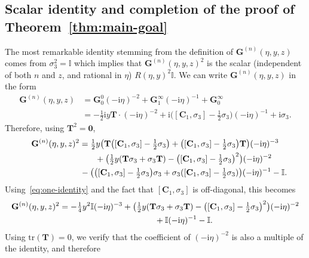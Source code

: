 \documentclass[11pt]{article}
\numberwithin{equation}{section}
\numberwithin{equation}{section}
\begin{document}
\subsection{Scalar identity and completion of the proof of Theorem~\ref{thm:main-goal}}
The most remarkable identity stemming from the definition of $\mathbf{G}^{(n)}(\eta,y,z)$ comes from $\sigma_3^2=\mathbb{I}$ which implies that $\mathbf{G}^{(n)}(\eta,y,z)^2$ is the scalar (independent of both $n$ and $z$, and rational in $\eta$) $R(\eta,y)^2\mathbb{I}$. We can write $\mathbf{G}^{(n)}(\eta,y,z)$ in the form
\begin{align*}
\mathbf{G}^{(n)}(\eta,y,z)& =\mathbf{G}_0^0(-\mathrm{i}\eta)^{-2} + \mathbf{G}_1^\infty(-\mathrm{i}\eta)^{-1} +\mathbf{G}_0^\infty \\
& = -\tfrac{1}{2}\mathrm{i} y\mathbf{T}\cdot(-\mathrm{i}\eta)^{-2} +
\mathrm{i} \bigl([\mathbf{C}_1,\sigma_3]-\tfrac{1}{2}\sigma_3\bigr)(-\mathrm{i}\eta)^{-1} +\mathrm{i}\sigma_3.
\end{align*}
Therefore, using $\mathbf{T}^2=\mathbf{0}$,
\begin{gather*}
\mathbf{G}^{(n)}(\eta,y,z)^2 = \tfrac{1}{2}y\bigl(\mathbf{T}\bigl([\mathbf{C}_1,\sigma_3]-\tfrac{1}{2}\sigma_3\bigr)+\bigl([\mathbf{C}_1,\sigma_3]-\tfrac{1}{2}\sigma_3\bigr)\mathbf{T}\bigr)(-\mathrm{i}\eta)^{-3} \\
\hphantom{\mathbf{G}^{(n)}(\eta,y,z)^2 = }{}+ \bigl(\tfrac{1}{2}y(\mathbf{T}\sigma_3 + \sigma_3\mathbf{T})-\bigl([\mathbf{C}_1,\sigma_3]-\tfrac{1}{2}\sigma_3\bigr)^2\bigr)(-\mathrm{i}\eta)^{-2} \\
\hphantom{\mathbf{G}^{(n)}(\eta,y,z)^2 = }{}-\bigl(\bigl([\mathbf{C}_1,\sigma_3]-\tfrac{1}{2}\sigma_3\bigr)\sigma_3 + \sigma_3([\mathbf{C}_1,\sigma_3]-\tfrac{1}{2}\sigma_3)\bigr)(-\mathrm{i}\eta)^{-1} -\mathbb{I}.
\end{gather*}
Using~\eqref{eq:one-identity} and the fact that $[\mathbf{C}_1,\sigma_3]$ is off-diagonal, this becomes
\begin{gather*}
\mathbf{G}^{(n)}(\eta,y,z)^2 = -\tfrac{1}{4}y^2\mathbb{I}(-\mathrm{i}\eta)^{-3} + \bigl(\tfrac{1}{2}y(\mathbf{T}\sigma_3 + \sigma_3\mathbf{T})-\bigl([\mathbf{C}_1,\sigma_3]-\tfrac{1}{2}\sigma_3\bigr)^2\bigr)(-\mathrm{i}\eta)^{-2} \\
\hphantom{\mathbf{G}^{(n)}(\eta,y,z)^2 =}{}+\mathbb{I}(-\mathrm{i}\eta)^{-1}-\mathbb{I}.
\end{gather*}
Using $\mathrm{tr}(\mathbf{T})=0$, we verify that the coefficient of $(-\mathrm{i}\eta)^{-2}$ is also a multiple of the identity, and therefore
\end{document}
